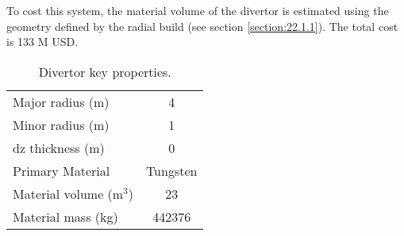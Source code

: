 To cost this system, the material volume of the divertor is estimated using the geometry defined by the radial build (see section \ref{section:22.1.1}). The total cost is 133 M USD.


 
 \begin{table}
     \centering
     \begin{tabular}{lc}
         Major radius (m)& 4\\
         Minor radius (m) & 1\\
         dz thickness (m) & 0\\
         Primary Material & Tungsten\\
         Material volume (m$^3$)& 23\\
         Material mass (kg) & 442376\\
     \end{tabular}
     \caption{Divertor key properties.}
     \label{tab:divertor prop}
 \end{table}
